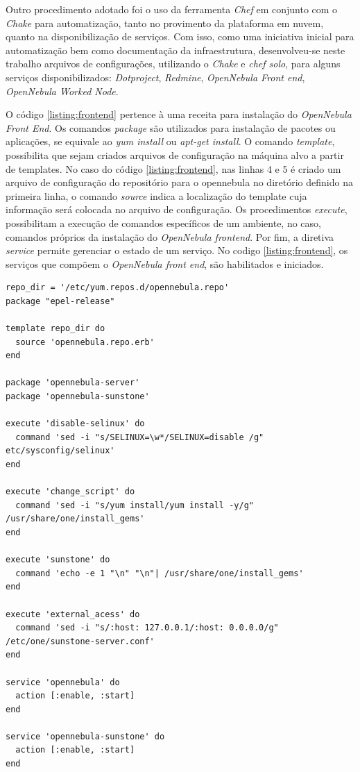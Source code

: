 Outro procedimento adotado foi o uso da ferramenta \textit{Chef} em conjunto com o \textit{Chake} para automatização, tanto no provimento da plataforma em nuvem, quanto na disponibilização de serviços. Com isso, como uma iniciativa inicial para automatização bem como documentação da infraestrutura, desenvolveu-se neste trabalho arquivos de configurações, utilizando o \textit{Chake} e \textit{chef solo}, para alguns serviços disponibilizados: \textit{Dotproject}, \textit{Redmine}, \textit{OpenNebula Front end}, \textit{OpenNebula Worked Node}. 

O código \ref{listing:frontend} pertence à uma receita para instalação do \textit{OpenNebula Front End}. Os comandos \textit{package} são utilizados para instalação de pacotes ou aplicações, se equivale ao \textit{yum install} ou \textit{apt-get install}. O comando \textit{template}, possibilita que sejam criados arquivos de configuração na máquina alvo a partir de templates. No caso do código \ref{listing:frontend}, nas linhas 4 e 5 é criado um arquivo de configuração do repositório para o opennebula no diretório definido na primeira linha, o comando \textit{source} indica a localização do template  cuja informação será colocada no arquivo de configuração. Os procedimentos \textit{execute}, possibilitam a execução de comandos específicos de um ambiente, no caso, comandos próprios da instalação do \textit{OpenNebula frontend}. Por fim, a diretiva \textit{service} permite gerenciar o estado de um serviço. No codigo \ref{listing:frontend}, os serviços que compõem o \textit{OpenNebula front end}, são habilitados e iniciados.

\begin{lstlisting}[label=listing:frontend, caption=opennebula.rb]
repo_dir = '/etc/yum.repos.d/opennebula.repo'
package "epel-release"

template repo_dir do
  source 'opennebula.repo.erb'
end

package 'opennebula-server'
package 'opennebula-sunstone'

execute 'disable-selinux' do
  command 'sed -i "s/SELINUX=\w*/SELINUX=disable /g" etc/sysconfig/selinux'
end

execute 'change_script' do
  command 'sed -i "s/yum install/yum install -y/g" /usr/share/one/install_gems'
end

execute 'sunstone' do
  command 'echo -e 1 "\n" "\n"| /usr/share/one/install_gems'
end

execute 'external_acess' do
  command 'sed -i "s/:host: 127.0.0.1/:host: 0.0.0.0/g" /etc/one/sunstone-server.conf'
end

service 'opennebula' do
  action [:enable, :start]
end

service 'opennebula-sunstone' do
  action [:enable, :start]
end


\end{lstlisting}










